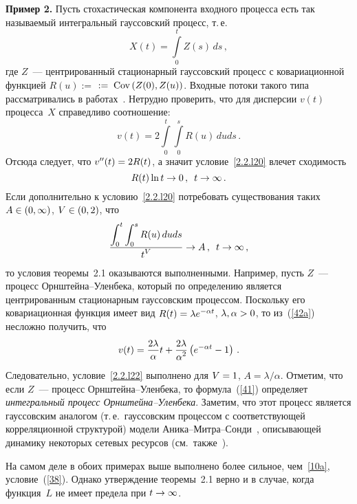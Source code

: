 \begin{multicols}{2}
\noindent
\textbf{Пример 2.} Пусть стохастическая компонента входного процесса
есть так называемый интегральный гауссовский процесс, т.\,е.
\begin{equation}
X(t)=\int\limits_0^t Z(s)\,ds\,,
\label{41}
\end{equation}
где $Z$~--- центрированный стационарный гауссовский процесс с
ковариационной функцией $R(u):=$\linebreak 
$:=\;\mathrm{Cov}\left(Z(0),Z(u)\right)$. Входные
потоки такого типа рассматрива\-лись в работах~\cite{Debicki1,Kulkarni}. Нетрудно проверить, что для дисперсии
$v(t)$ процесса~$X$ справедливо соотношение:
\begin{equation}
v(t)=2 \int\limits_0^t\!\! \int\limits_0^s R(u)\,duds\,.\label{42a}
\end{equation}
Отсюда следует, что $v''(t)\hm=2 R(t)$, а значит условие~\eqref{2.2.l20} влечет сходимость
\begin{equation*}
R(t)\ln t \to 0\,,\enskip t \to \infty\,. 
\end{equation*}
Если дополнительно к условию~\eqref{2.2.l20} потребовать
существования таких  $A \hm\in (0,\infty)$, $V \hm\in (0,2)$, что
\begin{equation}
\displaystyle\frac{\displaystyle \int_0^t \int_0^s R(u)\,duds\mathstrut}{\displaystyle t^V\mathstrut} \to A\,,\enskip
t \to \infty\,,
\label{2.2.l22}
\end{equation}
то условия теоремы~2.1 оказываются выполненными. Например,
пусть  $Z$~--- процесс Орн\-штей\-на--Улен\-бе\-ка, который по определению
является центрированным стационарным гауссовским процессом.
Поскольку его  ковариационная функция  имеет вид $R(t)\hm=\lambda
e^{-\alpha t}$, $\lambda,\alpha\hm>0$, то из~(\ref{42a}) несложно получить, что
$$
v(t)=\displaystyle\frac{\displaystyle 2 \lambda\mathstrut}{\displaystyle \alpha\mathstrut}t+\displaystyle\frac{\displaystyle 2\lambda\mathstrut}{\displaystyle \alpha^2\mathstrut}\left(e^{-\alpha t}-1\right)\,.
$$
Следовательно, условие~\eqref{2.2.l22} выполнено для $V\hm=1$,
$A={\lambda}/{\alpha}$. Отметим, что  если   $Z$~--- процесс
Орн\-штей\-на--Улен\-бе\-ка,  то формула~(\ref{41}) определяет   {\it
интегральный процесс Орн\-штей\-на--Улен\-бе\-ка}.  Заметим, что этот
процесс является гауссовским аналогом (т.\,е.\ гауссовским процессом с
соответствующей корреляционной структурой) модели
Ани\-ка--Мит\-ра--Сон\-ди~\cite{Anick}, описывающей динамику некоторых
сетевых ресурсов (см.\ так\-же~\cite{Addie}).

На самом деле в обоих примерах выше  выполнено   более сильное, чем~\eqref{10a}, 
условие~(\ref{38}).
Однако утверждение теоремы~2.1  верно и в случае, когда функция~$L$ не имеет предела при 
$t\hm\to\infty$.


\end{multicols}
